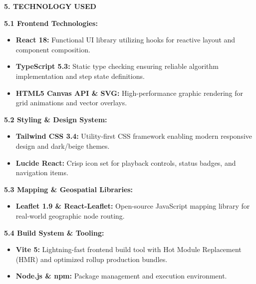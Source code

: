 \documentclass[12pt, a4paper]{article}
\begin{document}
\begin{center}
    {\Large \textbf{5. TECHNOLOGY USED}}
\end{center}
\vspace{0.3cm}

\textbf{5.1 Frontend Technologies:}
\begin{itemize}[leftmargin=2em, itemsep=4pt]
    \item \textbf{React 18:} Functional UI library utilizing hooks for reactive layout and component composition.
    \item \textbf{TypeScript 5.3:} Static type checking ensuring reliable algorithm implementation and step state definitions.
    \item \textbf{HTML5 Canvas API \& SVG:} High-performance graphic rendering for grid animations and vector overlays.
\end{itemize}

\vspace{0.3cm}
\textbf{5.2 Styling \& Design System:}
\begin{itemize}[leftmargin=2em, itemsep=4pt]
    \item \textbf{Tailwind CSS 3.4:} Utility-first CSS framework enabling modern responsive design and dark/beige themes.
    \item \textbf{Lucide React:} Crisp icon set for playback controls, status badges, and navigation items.
\end{itemize}

\vspace{0.3cm}
\textbf{5.3 Mapping \& Geospatial Libraries:}
\begin{itemize}[leftmargin=2em, itemsep=4pt]
    \item \textbf{Leaflet 1.9 \& React-Leaflet:} Open-source JavaScript mapping library for real-world geographic node routing.
\end{itemize}

\vspace{0.3cm}
\textbf{5.4 Build System \& Tooling:}
\begin{itemize}[leftmargin=2em, itemsep=4pt]
    \item \textbf{Vite 5:} Lightning-fast frontend build tool with Hot Module Replacement (HMR) and optimized rollup production bundles.
    \item \textbf{Node.js \& npm:} Package management and execution environment.
\end{itemize}

\newpage

\setcounter{page}{8}
\end{document}
